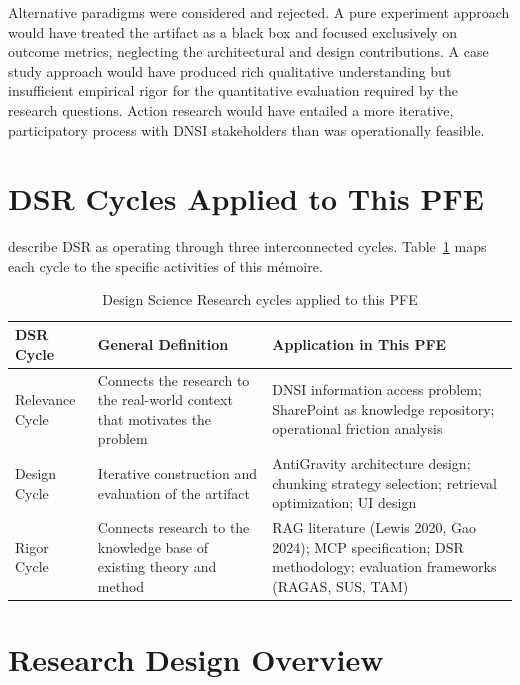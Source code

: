 Alternative paradigms were considered and rejected. A pure experiment approach would have treated the artifact as a black box and focused exclusively on outcome metrics, neglecting the architectural and design contributions. A case study approach would have produced rich qualitative understanding but insufficient empirical rigor for the quantitative evaluation required by the research questions. Action research would have entailed a more iterative, participatory process with DNSI stakeholders than was operationally feasible.

\section{DSR Cycles Applied to This PFE}
\label{sec:method-cycles}

\citet{Hevner2007} describe DSR as operating through three interconnected cycles. Table~\ref{tab:dsr-cycles} maps each cycle to the specific activities of this mémoire.

\begin{table}[H]
\centering
\caption{Design Science Research cycles applied to this PFE}
\label{tab:dsr-cycles}
\begin{tabularx}{\textwidth}{@{}lXX@{}}
\toprule
\textbf{DSR Cycle} & \textbf{General Definition} & \textbf{Application in This PFE} \\
\midrule
Relevance Cycle & Connects the research to the real-world context that motivates the problem & DNSI information access problem; SharePoint as knowledge repository; operational friction analysis \\
Design Cycle & Iterative construction and evaluation of the artifact & AntiGravity architecture design; chunking strategy selection; retrieval optimization; UI design \\
Rigor Cycle & Connects research to the knowledge base of existing theory and method & RAG literature (Lewis 2020, Gao 2024); MCP specification; DSR methodology; evaluation frameworks (RAGAS, SUS, TAM) \\
\bottomrule
\end{tabularx}
\end{table}

\section{Research Design Overview}
\label{sec:method-design}

